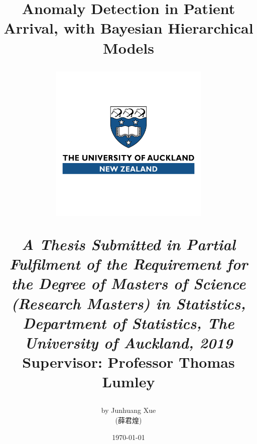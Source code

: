 \begin{titlepage}
			
	\title{\textbf{Anomaly Detection in Patient Arrival, with Bayesian Hierarchical Models}
	\author{by Junhuang Xue \begin{CJK}{UTF8}{bsmi}(薛君煌)\end{CJK}} 
	\begin{center}
	\includegraphics[width=3in]{"Figures/UoA logos/UoAlogotransparent"}
	\end{center}
	\textit {\footnotesize{A Thesis Submitted in Partial Fulfilment of the Requirement for the Degree of Masters of Science (Research Masters) in Statistics,
	\linebreak \footnotesize{Department of Statistics, The University of Auckland, 2019}}}
	\vspace{1cm}
	\linebreak \footnotesize{Supervisor: Professor Thomas Lumley}
	\date{\today}
	}
	\maketitle
			
\end{titlepage}